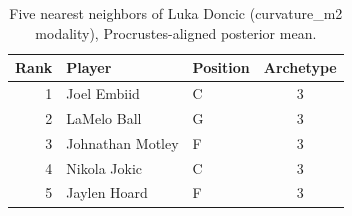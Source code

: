 \begin{table}[htbp]
  \centering\small
  \begin{tabular}{rllc}
    \toprule
    Rank & Player & Position & Archetype \\
    \midrule
    1 & Joel Embiid & C & 3 \\
    2 & LaMelo Ball & G & 3 \\
    3 & Johnathan Motley & F & 3 \\
    4 & Nikola Jokic & C & 3 \\
    5 & Jaylen Hoard & F & 3 \\
    \bottomrule
  \end{tabular}
  \caption{Five nearest neighbors of Luka Doncic (curvature_m2 modality), Procrustes-aligned posterior mean.}
  \label{tab:Luka_Doncic_neighbors_curvature_m2}
\end{table}

